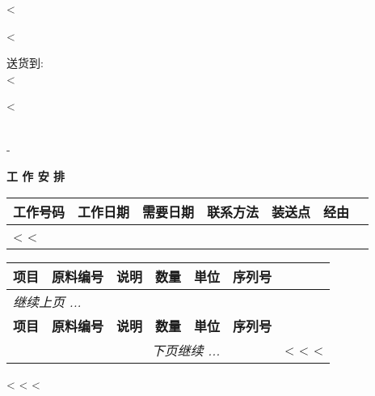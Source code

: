 <%


\begin{CJK}{UTF8}{arialuni}

\vspace*{-3.3cm}
<%
\vspace*{1.5cm}

\parbox[t]{.6\textwidth}{
\vspace{0.3cm}

送货到: \\
<%
}
\parbox[t]{.45\textwidth}{
\vspace{0.3cm}
<%
}

\hfill \\
-
\vspace{1.0cm}

\centerline{\large\bf{工 作 安 排}}
\normalsize
\hfill

\vspace{1cm}

\begin{tabularx}{\textwidth}{*{7}{|X}|} \hline
  \textbf{工作号码} & \textbf{工作日期} & \textbf{需要日期} & \textbf{联系方法}
  & \textbf{装送点} & \textbf{经由} \\ [0.5em]
  \hline
  <%
  <%
  \hline
\end{tabularx}

\vspace{0.5cm}

\begin{longtable}{|ll p{5.5cm} @{\extracolsep\fill} rcl|} \hline
\xstrut
  \textbf{项目} & \textbf{原料编号} & \textbf{说明} & \textbf{数量} & \textbf{単位}  & \textbf{序列号} \\     
  \hline
\endfirsthead
  \multicolumn{5}{l}{\emph{继续上页 ...}} \\
  \hline
  \textbf{项目} & \textbf{原料编号} & \textbf{说明} & \textbf{数量} & \textbf{単位}  & \textbf{序列号} \\     
  \hline
\endhead
   \hline \multicolumn{5}{r}{\emph{下页继续 ...}}
\endfoot
   \hline
\endlastfoot
<%
  <%
  <%
		& & <%
	<%
<%
\end{longtable}

\parbox{\textwidth}{
\vspace{0.5cm}
<%
  <%
<%
}

\vfill
\end{CJK}
